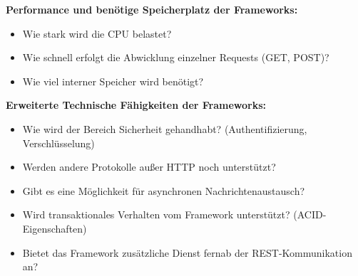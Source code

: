 \textbf{Performance und benötige Speicherplatz der Frameworks:}
\begin{itemize}
	\item Wie stark wird die CPU belastet?  
	\item Wie schnell erfolgt die Abwicklung einzelner Requests (GET, POST)?
	\item Wie viel interner Speicher wird benötigt?
\end{itemize}

\textbf{Erweiterte Technische Fähigkeiten der Frameworks:}
\begin{itemize}
	\item Wie wird der Bereich Sicherheit gehandhabt?  (Authentifizierung, Verschlüsselung)
	\item Werden andere Protokolle außer HTTP noch unterstützt?
	\item Gibt es eine Möglichkeit für asynchronen Nachrichtenaustausch?
	\item Wird transaktionales Verhalten vom Framework unterstützt? (ACID-Eigenschaften)
	\item Bietet das Framework zusätzliche Dienst fernab der REST-Kommunikation an?
\end{itemize}
